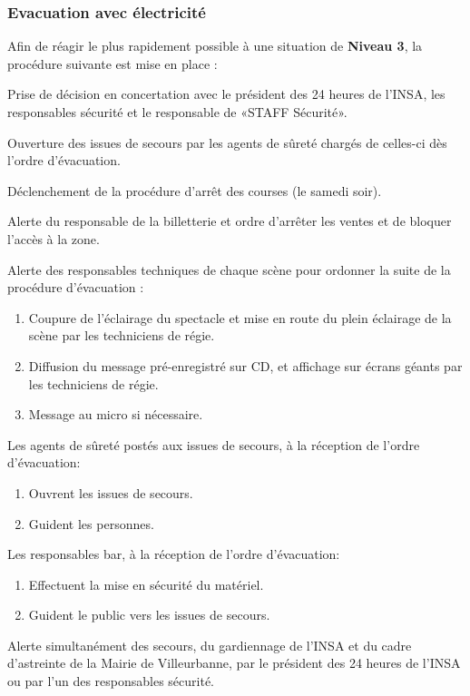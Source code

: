 \documentclass[hidelinks, paper=a4, fontsize=13pt]{report}
\begin{document}
\subsubsection{Evacuation avec électricité}
Afin de réagir le plus rapidement possible à une situation de \textbf{Niveau 3}, la procédure suivante est mise en place :
\begin{list}{•}{}
	\item Prise de décision en concertation avec le président des 24 heures de l'INSA, les responsables sécurité et le responsable de «STAFF Sécurité».
	\item Ouverture des issues de secours par les agents de sûreté chargés de celles-ci dès l’ordre d’évacuation.
	\item Déclenchement de la procédure d’arrêt des courses (le samedi soir).
	\item Alerte du responsable de la billetterie et ordre d'arrêter les ventes et de bloquer l’accès à la zone. 
	\item Alerte des responsables techniques de chaque scène pour ordonner la suite de la procédure d’évacuation :
	\begin{enumerate}
		\item Coupure de l’éclairage du spectacle et mise en route du plein éclairage de la scène par les techniciens de régie. 
		\item Diffusion du message pré-enregistré sur CD, et affichage sur écrans géants par les techniciens de régie.
		\item Message au micro si nécessaire.
	\end{enumerate}
	\item Les agents de sûreté postés aux issues de secours, à la réception de l’ordre d’évacuation:
	\begin{enumerate}
		\item Ouvrent les issues de secours.
		\item Guident les personnes.
	\end{enumerate}
	\item Les responsables bar, à la réception de l’ordre d’évacuation:
	\begin{enumerate}
		\item Effectuent la mise en sécurité du matériel.
		\item Guident le public vers les issues de secours.
	\end{enumerate}
	\item Alerte simultanément des secours, du gardiennage de l’INSA et du cadre d’astreinte de la Mairie de Villeurbanne, par le président des 24 heures de l'INSA ou par l'un des responsables sécurité.

\end{list}
\end{document}
